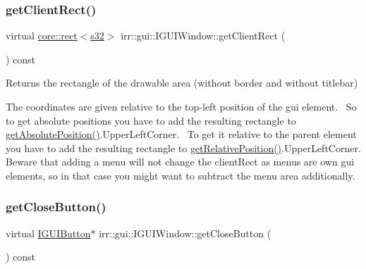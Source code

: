 \subsubsection{\texorpdfstring{get\+Client\+Rect()}{getClientRect()}\hspace{0.1cm}{\footnotesize\ttfamily [2/2]}}
{\footnotesize\ttfamily virtual \hyperlink{classirr_1_1core_1_1rect}{core\+::rect}$<$\hyperlink{namespaceirr_ac66849b7a6ed16e30ebede579f9b47c6}{s32}$>$ irr\+::gui\+::\+I\+G\+U\+I\+Window\+::get\+Client\+Rect (\begin{DoxyParamCaption}{ }\end{DoxyParamCaption}) const\hspace{0.3cm}{\ttfamily [pure virtual]}}



Returns the rectangle of the drawable area (without border and without titlebar) 

The coordinates are given relative to the top-\/left position of the gui element.~\newline
 So to get absolute positions you have to add the resulting rectangle to \hyperlink{classirr_1_1gui_1_1IGUIElement_a6c5b94dd889533a306a03e25d0998bdf}{get\+Absolute\+Position()}.Upper\+Left\+Corner.~\newline
 To get it relative to the parent element you have to add the resulting rectangle to \hyperlink{classirr_1_1gui_1_1IGUIElement_a056c893bcfe330c9c6058b6027a45cef}{get\+Relative\+Position()}.Upper\+Left\+Corner. Beware that adding a menu will not change the client\+Rect as menus are own gui elements, so in that case you might want to subtract the menu area additionally. \mbox{\label{classirr_1_1gui_1_1IGUIWindow_ae5b6abf3c9d8d0af5539adf3fea8db70}} 
\subsubsection{\texorpdfstring{get\+Close\+Button()}{getCloseButton()}\hspace{0.1cm}{\footnotesize\ttfamily [1/2]}}
{\footnotesize\ttfamily virtual \hyperlink{classirr_1_1gui_1_1IGUIButton}{I\+G\+U\+I\+Button}$\ast$ irr\+::gui\+::\+I\+G\+U\+I\+Window\+::get\+Close\+Button (\begin{DoxyParamCaption}{ }\end{DoxyParamCaption}) const\hspace{0.3cm}{\ttfamily [pure virtual]}}




